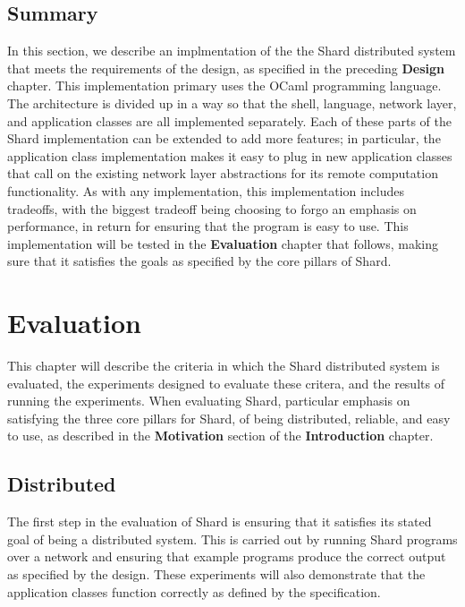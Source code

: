 \documentclass[twoside]{report}
\begin{document}
\section{Summary}

In this section, we describe an implmentation of the the Shard distributed system that meets the requirements of the design, as specified in the preceding \textbf{Design} chapter.
This implementation primary uses the OCaml programming language.
The architecture is divided up in a way so that the shell, language, network layer, and application classes are all implemented separately.
Each of these parts of the Shard implementation can be extended to add more features; in particular, the application class implementation makes it easy to plug in new application classes that call on the existing network layer abstractions for its remote computation functionality.
As with any implementation, this implementation includes tradeoffs, with the biggest tradeoff being choosing to forgo an emphasis on performance, in return for ensuring that the program is easy to use.
This implementation will be tested in the \textbf{Evaluation} chapter that follows, making sure that it satisfies the goals as specified by the core pillars of Shard.


\chapter{Evaluation}

This chapter will describe the criteria in which the Shard distributed system is evaluated, the experiments designed to evaluate these critera, and the results of running the experiments.
When evaluating Shard, particular emphasis on satisfying the three core pillars for Shard, of being distributed, reliable, and easy to use, as described in the \textbf{Motivation} section of the \textbf{Introduction} chapter.

\section{Distributed}

The first step in the evaluation of Shard is ensuring that it satisfies its stated goal of being a distributed system.
This is carried out by running Shard programs over a network and ensuring that example programs produce the correct output as specified by the design.
These experiments will also demonstrate that the application classes function correctly as defined by the specification.
\end{document}
